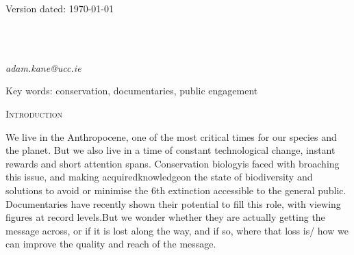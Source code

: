 \documentclass[12pt,letterpaper]{article}
\renewcommand{\section}[1]{%
\bigskip
\begin{center}
\begin{Large}
\normalfont\scshape #1
\medskip
\end{Large}
\end{center}}
\begin{document}
\begin{flushright}
Version dated: \today
\end{flushright}

\bigskip
\medskip
\begin{center}


\bigskip

\\
\\

\end{center}
\medskip
{} \textit{adam.kane@ucc.ie}\\  
\vspace{1in}

\modulolinenumbers[1]
\linenumbers

%
%
\begin{abstract}
\end{abstract}

\noindent Key words: conservation, documentaries, public engagement\\


%
%

\newpage 
\section{Introduction}
We live in the Anthropocene, one of the most critical times for our species and the planet. But we also live in a time of constant technological change, instant rewards and short attention spans. Conservation biologyis faced with broaching this issue, and making acquiredknowledgeon the state of biodiversity and solutions to avoid or minimise the 6th extinction accessible to the general public. Documentaries have recently shown their potential to fill this role, with viewing figures at record levels.But we wonder whether they are actually getting the message across, or if it is lost along the way, and if so, where that loss is/ how we can improve the quality and reach of the message.
\end{document}
